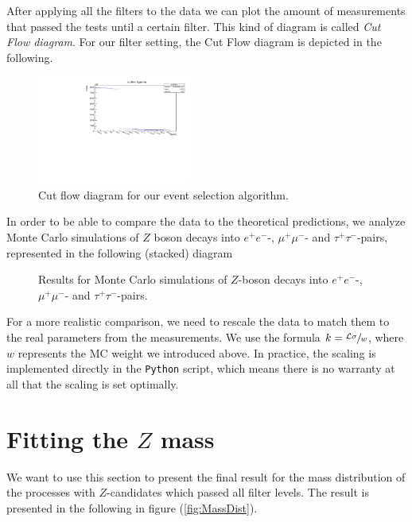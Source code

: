 \documentclass[twocolumn,
			   showpacs,%
               nofootinbib,
               aps,%
               prd,
               notitlepage,
               showkeys,
               10pt]{revtex4-1}
\begin{document}
After applying all the filters to the data we can plot the amount of measurements that passed the tests until a certain  filter. This kind of diagram is called \textit{Cut Flow diagram}. For our filter setting, the Cut Flow diagram is depicted in the following.
\begin{figure}[H]
\centering
\includegraphics[width = 0.45\textwidth]
{figures/plots/CutFlow}
\caption{Cut flow diagram for our event selection algorithm.}	
\end{figure}


In order to be able to compare the data to the theoretical predictions, we analyze Monte Carlo simulations of $Z$ boson decays into $e^+e^-$-, $\mu^+\mu^-$- and $\tau^+\tau^-$-pairs, represented in the following (stacked) diagram %

\begin{figure}[H]
	\centering
	\caption{Results for Monte Carlo simulations of $Z$-boson decays into $e^+e^-$-, $\mu^+\mu^-$- and $\tau^+\tau^-$-pairs.}
	\label{fig:MChisto}
\end{figure}

For a more realistic comparison, we need to rescale the data to match them to the real parameters from the measurements. We use the formula $k = \sfrac{\mathcal{L}\sigma}{w}$, where $w$ represents the MC weight we introduced above. In practice, the scaling is implemented directly in the \verb|Python| script, which means there is no warranty at all that the scaling is set optimally. \\

\blindtext
\section{Fitting the $Z$ mass}

We want to use this section to present the final result for the mass distribution of the processes with $Z$-candidates which passed all filter levels. The result is presented in the following in figure (\ref{fig:MassDist}).
\end{document}
